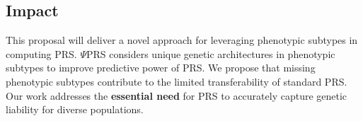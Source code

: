 \documentclass[11pt]{article}  %
\begin{document}
\subsection*{Impact}
This proposal will deliver a novel approach for leveraging phenotypic subtypes in computing PRS. $\Psi$PRS considers unique genetic architectures in phenotypic subtypes to improve predictive power of PRS. We propose that missing phenotypic subtypes contribute to the limited transferability of standard PRS. Our work addresses the \textbf{essential need} for PRS to accurately capture genetic liability for diverse populations.         





\newpage

\end{document}
